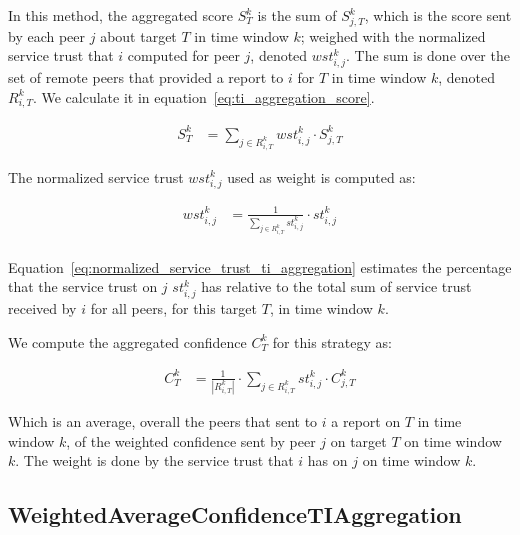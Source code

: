 In this method, the aggregated score $S^{k}_{T}$ is the sum of $S^{k}_{j, T}$, which is the score sent by each peer $j$ about target $T$ in time window $k$; weighed with the normalized service trust that $i$ computed for peer $j$, denoted $wst^{k}_{i, j}$. The sum is done over the set of remote peers that provided a report to $i$ for $T$ in time window $k$, denoted $R^{k}_{i, T}$. We calculate it in equation~\ref{eq:ti_aggregation_score}.

\begin{equation}
\begin{split}
    S^{k}_{T} &= \sum_{{j}\in R^{k}_{i, T}} wst^{k}_{i, j} \cdot S^{k}_{j, T}
\end{split}
\label{eq:ti_aggregation_score}
\end{equation}

\noindent
The normalized service trust $wst^{k}_{i,j}$ used as weight is computed as:

\begin{equation}
\begin{split}
    wst^{k}_{i,j} &= \frac{1}{\sum_{{j}\in R^{k}_{i, T}} st^{k}_{i, j}} \cdot st^{k}_{i, j} \\
\end{split}
\label{eq:normalized_service_trust_ti_aggregation}
\end{equation}

\noindent
Equation~\ref{eq:normalized_service_trust_ti_aggregation} estimates the percentage that the service trust on $j$ $st^{k}_{i, j}$ has relative to the total sum of service trust received by $i$ for all peers, for this target $T$, in time window $k$.

We compute the aggregated confidence $C^{k}_{T}$ for this strategy as:

\begin{equation}
\begin{split}
    C^{k}_{T} &= \frac{1}{|R^{k}_{i, T}|} \cdot \sum_{{j}\in R^{k}_{i, T}} st^{k}_{i, j} \cdot C^{k}_{j, T}
\end{split}
\end{equation}

\noindent
Which is an average, overall the peers that sent to $i$ a report on $T$ in time window $k$, of the weighted confidence sent by peer $j$ on target $T$ on time window $k$. The weight is done by the service trust that $i$ has on $j$ on time window $k$.


\subsection{WeightedAverageConfidenceTIAggregation}
\label{subsec:WeightedAverageConfidenceTIAggregation}

